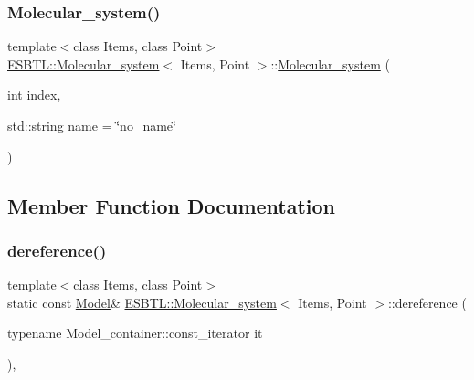 \subsubsection{\texorpdfstring{Molecular\+\_\+system()}{Molecular\_system()}}
{\footnotesize\ttfamily template$<$class Items, class Point$>$ \\
\hyperlink{classESBTL_1_1Molecular__system}{E\+S\+B\+T\+L\+::\+Molecular\+\_\+system}$<$ Items, Point $>$\+::\hyperlink{classESBTL_1_1Molecular__system}{Molecular\+\_\+system} (\begin{DoxyParamCaption}\item[{int}]{index,  }\item[{std\+::string}]{name = {\ttfamily \char`\"{}no\+\_\+name\char`\"{}} }\end{DoxyParamCaption})\hspace{0.3cm}{\ttfamily [inline]}}



\subsection{Member Function Documentation}
\mbox{\label{classESBTL_1_1Molecular__system_af6cbfc5a6e1bbc5168552fe6737ef07b}} 
\subsubsection{\texorpdfstring{dereference()}{dereference()}\hspace{0.1cm}{\footnotesize\ttfamily [1/2]}}
{\footnotesize\ttfamily template$<$class Items, class Point$>$ \\
static const \hyperlink{classESBTL_1_1Molecular__system_ac99c9f22457fd0498324fb5cfc276227}{Model}\& \hyperlink{classESBTL_1_1Molecular__system}{E\+S\+B\+T\+L\+::\+Molecular\+\_\+system}$<$ Items, Point $>$\+::dereference (\begin{DoxyParamCaption}\item[{typename Model\+\_\+container\+::const\+\_\+iterator}]{it }\end{DoxyParamCaption})\hspace{0.3cm}{\ttfamily [inline]}, {\ttfamily [static]}}

\mbox{\label{classESBTL_1_1Molecular__system_a8fd09025074fb056d79eb0c79fa03afd}} 
